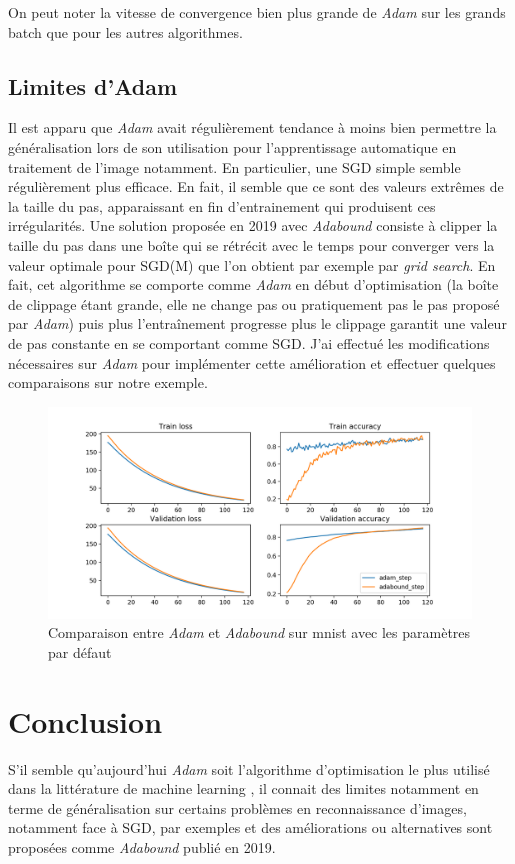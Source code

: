 \documentclass[fleqn,11pt, titlepage, french]{article}
\begin{document}
	On peut noter la vitesse de convergence bien plus grande de \emph{Adam} sur les grands batch que pour les autres algorithmes.
	
	
\subsection{Limites d'Adam}

Il est apparu que \emph{Adam} avait régulièrement tendance à moins bien permettre la généralisation lors de son utilisation pour l'apprentissage automatique en traitement de l'image notamment. En particulier, une SGD simple semble régulièrement plus efficace. En fait, il semble que ce sont des valeurs extrêmes de la taille du pas, apparaissant en fin d'entrainement qui produisent ces irrégularités. Une solution proposée en 2019 avec \emph{Adabound}\cite{limits} consiste à clipper la taille du pas dans une boîte qui se rétrécit avec le temps pour converger vers la valeur optimale pour SGD(M) que l'on obtient par exemple par \emph{grid search}. En fait, cet algorithme se comporte comme \emph{Adam} en début d'optimisation (la boîte de clippage étant grande, elle ne change pas ou pratiquement pas le pas proposé par \emph{Adam}) puis plus l'entraînement progresse plus le clippage garantit une valeur de pas constante en se comportant comme SGD. J'ai effectué les modifications nécessaires sur \emph{Adam} pour implémenter cette amélioration et effectuer quelques comparaisons sur notre exemple.

\begin{figure}[H]
	\centering
	\includegraphics[scale=0.5]{img/mnist-comparison-adam-adabound.png}
	\caption{Comparaison entre \emph{Adam} et \emph{Adabound} sur mnist avec les paramètres par défaut}
\end{figure}
	
\section{Conclusion}

S'il semble qu'aujourd'hui \emph{Adam} soit l'algorithme d'optimisation le plus utilisé dans la littérature de machine learning \cite{adamtrend}, il connait des limites notamment en terme de généralisation sur certains problèmes en reconnaissance d'images, notamment face à SGD, par exemples et des améliorations ou alternatives sont proposées\cite{limits} comme \emph{Adabound} publié en 2019.
	
\newpage
	
	
\end{document}
